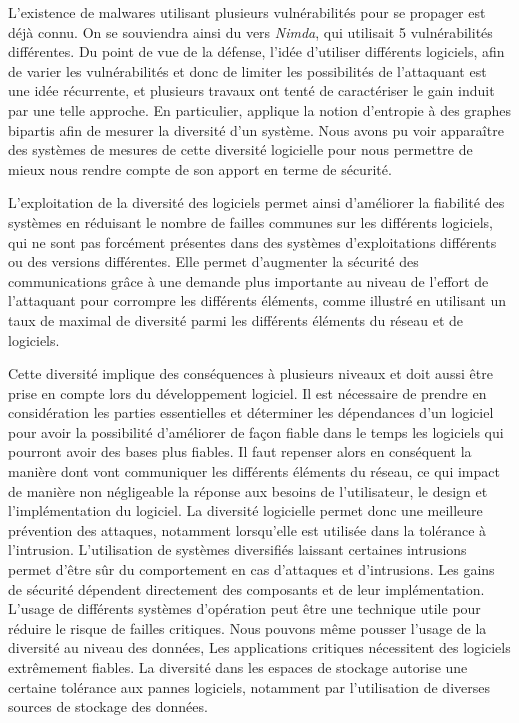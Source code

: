 L'existence de malwares utilisant plusieurs vulnérabilités pour se propager est déjà connu. On se souviendra ainsi du
vers \textit{Nimda}, qui utilisait 5 vulnérabilités différentes. Du point de vue de la défense, l'idée d'utiliser différents
logiciels, afin de varier les vulnérabilités et donc de limiter les possibilités de l'attaquant est une idée récurrente, et plusieurs
travaux ont tenté de caractériser le gain induit par une telle approche. En particulier, \cite{softwareDiversity:Security}
applique la notion d'entropie à des graphes bipartis afin de mesurer la diversité d'un système. Nous avons pu voir apparaître des systèmes de mesures de cette diversité logicielle \cite{softwareDiversityMetrics} pour nous permettre de mieux nous rendre compte de son apport en terme de sécurité.

L'exploitation de la diversité des logiciels permet ainsi d'améliorer la fiabilité des systèmes en réduisant le nombre de failles communes sur les différents logiciels, qui ne sont pas forcément présentes dans des systèmes d'exploitations différents ou des versions différentes.\cite{softwareDiversityPracticalStatistics}
Elle permet d'augmenter la sécurité des communications grâce à une demande plus importante au niveau de l'effort de l'attaquant pour corrompre les différents éléments, comme illustré en utilisant un taux de maximal de diversité parmi les différents éléments du réseau et de logiciels\cite{maximalRatio}. 

Cette diversité implique des conséquences à plusieurs niveaux et doit aussi être prise en compte lors du développement logiciel\cite{processDiversity}. Il est nécessaire de prendre en considération les parties essentielles et déterminer les dépendances d'un logiciel pour avoir la possibilité d'améliorer de façon fiable dans le temps les logiciels qui pourront avoir des bases plus fiables. Il faut repenser alors en conséquent la manière dont vont communiquer les différents éléments du réseau, ce qui impact de manière non négligeable la réponse aux besoins de l'utilisateur, le design et l'implémentation du logiciel.
La diversité logicielle permet donc une meilleure prévention des attaques, notamment lorsqu'elle est utilisée dans la tolérance à l'intrusion\cite{osDiversity}. L'utilisation de systèmes diversifiés laissant certaines intrusions permet d’être sûr du comportement en cas d’attaques et d’intrusions. Les gains de sécurité dépendent directement des composants et de leur implémentation. L'usage de différents systèmes d'opération peut être une technique utile pour réduire le risque de failles critiques. 
Nous pouvons même pousser l'usage de la diversité au niveau des données, Les applications critiques nécessitent des logiciels extrêmement fiables.  La diversité dans les espaces de stockage autorise une certaine tolérance aux pannes logiciels\cite{dataDiversity}, notamment par l'utilisation de diverses sources de stockage des données.


